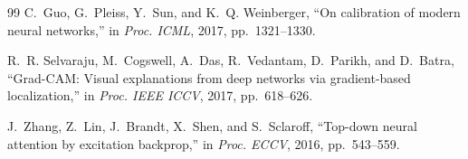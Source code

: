 \documentclass[conference]{IEEEtran}
\begin{document}
\begin{thebibliography}{99}
C.~Guo, G.~Pleiss, Y.~Sun, and K.~Q. Weinberger, ``On calibration of modern neural networks,'' in
\emph{Proc. ICML}, 2017, pp.~1321--1330.

R.~R. Selvaraju, M.~Cogswell, A.~Das, R.~Vedantam, D.~Parikh, and D.~Batra, ``Grad-CAM: Visual explanations from
deep networks via gradient-based localization,'' in \emph{Proc. IEEE ICCV}, 2017, pp.~618--626.

J.~Zhang, Z.~Lin, J.~Brandt, X.~Shen, and S.~Sclaroff, ``Top-down neural attention by excitation backprop,'' in
\emph{Proc. ECCV}, 2016, pp.~543--559.

\end{thebibliography}
\end{document}
